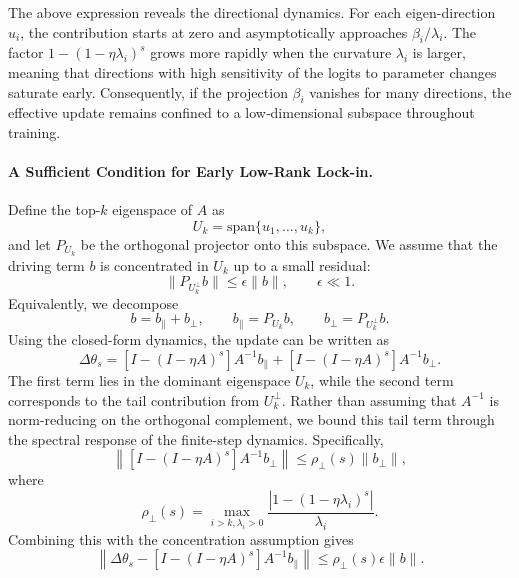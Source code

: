 \documentclass{article}
\begin{document}
The above expression reveals the directional dynamics. For each eigen-direction \(u_i\), the contribution starts at zero and asymptotically approaches \(\beta_i/\lambda_i\). The factor \(1-(1-\eta\lambda_i)^s\) grows more rapidly when the curvature \(\lambda_i\) is larger, meaning that directions with high sensitivity of the logits to parameter changes saturate early. Consequently, if the projection \(\beta_i\) vanishes for many directions, the effective update remains confined to a low‑dimensional subspace throughout training.

\paragraph{A Sufficient Condition for Early Low-Rank Lock-in.}
Define the top-\(k\) eigenspace of \(A\) as
\[
U_k=\mathrm{span}\{u_1,\dots,u_k\},
\]
and let \(P_{U_k}\) be the orthogonal projector onto this subspace. We assume that the driving term \(b\) is concentrated in \(U_k\) up to a small residual:
\begin{equation}
\|P_{U_k^\perp}b\|\leq \epsilon\|b\|,
\qquad
\epsilon\ll 1.
\end{equation}
Equivalently, we decompose
\[
b=b_{\parallel}+b_{\perp},
\qquad
b_{\parallel}=P_{U_k}b,
\qquad
b_{\perp}=P_{U_k^\perp}b .
\]
Using the closed-form dynamics, the update can be written as
\begin{equation}
\Delta\theta_s
=
[I-(I-\eta A)^s]A^{-1}b_{\parallel}
+
[I-(I-\eta A)^s]A^{-1}b_{\perp}.
\end{equation}
The first term lies in the dominant eigenspace \(U_k\), while the second term corresponds to the tail contribution from \(U_k^\perp\). Rather than assuming that \(A^{-1}\) is norm-reducing on the orthogonal complement, we bound this tail term through the spectral response of the finite-step dynamics. Specifically,
\begin{equation}
\left\|
[I-(I-\eta A)^s]A^{-1}b_{\perp}
\right\|
\leq
\rho_{\perp}(s)\|b_{\perp}\|,
\end{equation}
where
\begin{equation}
\rho_{\perp}(s)
=
\max_{i>k,\lambda_i>0}
\frac{\left|1-(1-\eta\lambda_i)^s\right|}{\lambda_i}.
\end{equation}
Combining this with the concentration assumption gives
\begin{equation}
\left\|
\Delta\theta_s
-
[I-(I-\eta A)^s]A^{-1}b_{\parallel}
\right\|
\leq
\rho_{\perp}(s)\epsilon\|b\|.
\end{equation}
\end{document}
